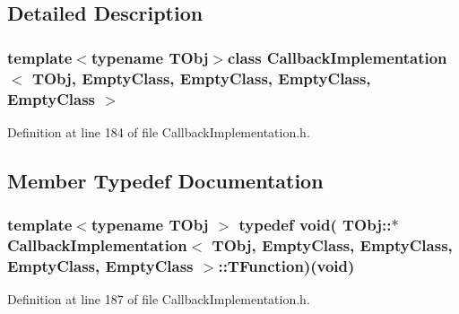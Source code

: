\subsection{Detailed Description}
\subsubsection*{template$<$typename T\-Obj$>$class Callback\-Implementation$<$ T\-Obj, Empty\-Class, Empty\-Class, Empty\-Class, Empty\-Class $>$}



Definition at line 184 of file Callback\-Implementation.\-h.



\subsection{Member Typedef Documentation}
\hypertarget{class_callback_implementation_3_01_t_obj_00_01_empty_class_00_01_empty_class_00_01_empty_class_00_01_empty_class_01_4_afdd9e1b4fc45011f9b611354beefd863}{
\subsubsection[{T\-Function}]{\setlength{\rightskip}{0pt plus 5cm}template$<$typename T\-Obj $>$ typedef void( T\-Obj\-::$\ast$ {\bf Callback\-Implementation}$<$ T\-Obj, {\bf Empty\-Class}, {\bf Empty\-Class}, {\bf Empty\-Class}, {\bf Empty\-Class} $>$\-::T\-Function)(void)}}\label{class_callback_implementation_3_01_t_obj_00_01_empty_class_00_01_empty_class_00_01_empty_class_00_01_empty_class_01_4_afdd9e1b4fc45011f9b611354beefd863}


Definition at line 187 of file Callback\-Implementation.\-h.



